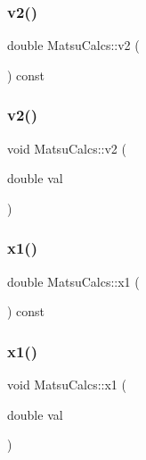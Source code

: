 \subsubsection{\texorpdfstring{v2()}{v2()}\hspace{0.1cm}{\footnotesize\ttfamily [1/2]}}
{\footnotesize\ttfamily double Matsu\+Calcs\+::v2 (\begin{DoxyParamCaption}{ }\end{DoxyParamCaption}) const\hspace{0.3cm}{\ttfamily [inline]}}

\mbox{\label{classMatsuCalcs_aafa56580a42b21f3b15c0170d9b2f2a6}} 
\subsubsection{\texorpdfstring{v2()}{v2()}\hspace{0.1cm}{\footnotesize\ttfamily [2/2]}}
{\footnotesize\ttfamily void Matsu\+Calcs\+::v2 (\begin{DoxyParamCaption}\item[{double}]{val }\end{DoxyParamCaption})\hspace{0.3cm}{\ttfamily [inline]}}

\mbox{\label{classMatsuCalcs_a212b674e8650c992b634d97f516e5edd}} 
\subsubsection{\texorpdfstring{x1()}{x1()}\hspace{0.1cm}{\footnotesize\ttfamily [1/2]}}
{\footnotesize\ttfamily double Matsu\+Calcs\+::x1 (\begin{DoxyParamCaption}{ }\end{DoxyParamCaption}) const\hspace{0.3cm}{\ttfamily [inline]}}

\mbox{\label{classMatsuCalcs_a4b5c02fd37cd1f400c7281b4a0a54c3d}} 
\subsubsection{\texorpdfstring{x1()}{x1()}\hspace{0.1cm}{\footnotesize\ttfamily [2/2]}}
{\footnotesize\ttfamily void Matsu\+Calcs\+::x1 (\begin{DoxyParamCaption}\item[{double}]{val }\end{DoxyParamCaption})\hspace{0.3cm}{\ttfamily [inline]}}

